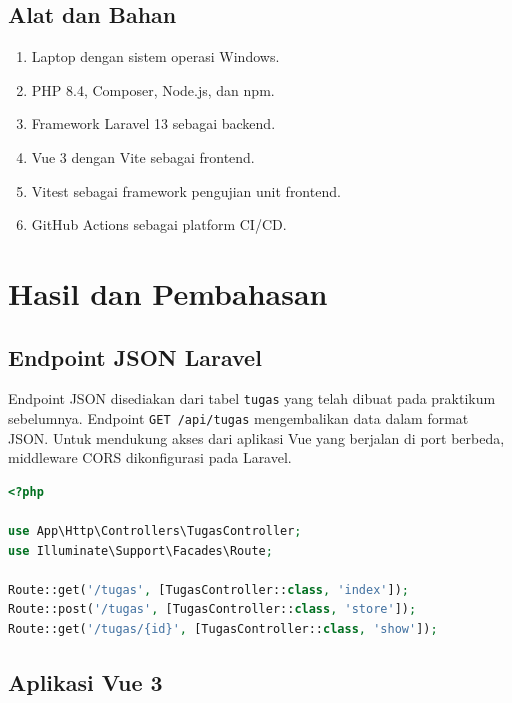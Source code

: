 \documentclass[a4paper,oneside,11pt]{book}
\begin{document}
\section{Alat dan Bahan}
\begin{enumerate}
    \item Laptop dengan sistem operasi Windows.
    \item PHP 8.4, Composer, Node.js, dan npm.
    \item Framework Laravel 13 sebagai backend.
    \item Vue 3 dengan Vite sebagai frontend.
    \item Vitest sebagai framework pengujian unit frontend.
    \item GitHub Actions sebagai platform CI/CD.
\end{enumerate}

\chapter{Hasil dan Pembahasan}

\section{Endpoint JSON Laravel}

Endpoint JSON disediakan dari tabel \texttt{tugas} yang telah dibuat pada praktikum sebelumnya. Endpoint \texttt{GET /api/tugas} mengembalikan data dalam format JSON. Untuk mendukung akses dari aplikasi Vue yang berjalan di port berbeda, middleware CORS dikonfigurasi pada Laravel.

\begin{lstlisting}[language=php, caption={Endpoint API pada routes/api.php}]
<?php

use App\Http\Controllers\TugasController;
use Illuminate\Support\Facades\Route;

Route::get('/tugas', [TugasController::class, 'index']);
Route::post('/tugas', [TugasController::class, 'store']);
Route::get('/tugas/{id}', [TugasController::class, 'show']);
\end{lstlisting}


\section{Aplikasi Vue 3}
\end{document}
